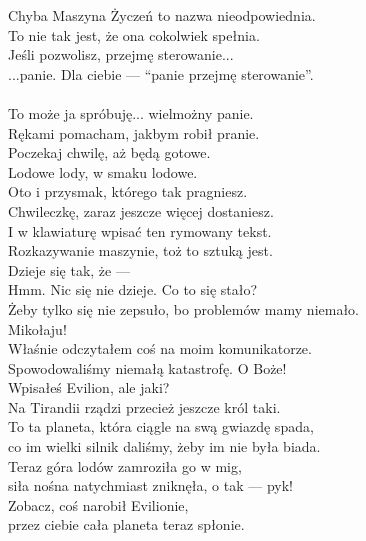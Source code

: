 \charprzy{}
Chyba Maszyna Życzeń to nazwa nieodpowiednia.\\
To nie tak jest, że ona cokolwiek spełnia.\\
Jeśli pozwolisz, przejmę sterowanie...\\

\chardok{}
...panie.
Dla ciebie --- "`panie przejmę sterowanie"'.\\

\\

\charmik{}
To może ja spróbuję... wielmożny panie.\\
Rękami pomacham, jakbym robił pranie.\\
Poczekaj chwilę, aż będą gotowe.\\
Lodowe lody, w smaku lodowe.\\
Oto i przysmak, którego tak pragniesz.\\
Chwileczkę, zaraz jeszcze więcej dostaniesz.\\
I w klawiaturę wpisać ten rymowany tekst.\\
Rozkazywanie maszynie, toż to sztuką jest.\\
Dzieje się tak, że --- \\
Hmm. Nic się nie dzieje. Co to się stało?\\
Żeby tylko się nie zepsuło, bo problemów mamy niemało.\\

\charnad{}
Mikołaju!\\
Właśnie odczytałem coś na moim komunikatorze. \\
Spowodowaliśmy niemałą katastrofę. O Boże!\\
Wpisałeś Evilion, ale jaki?\\
Na Tirandii rządzi przecież jeszcze król taki.\\
To ta planeta, która ciągle na swą gwiazdę spada,\\
co im wielki silnik daliśmy, żeby im nie była biada.\\
Teraz góra lodów zamroziła go w mig,\\
siła nośna natychmiast zniknęła, o tak --- pyk!\\

\charmik{}
Zobacz, coś narobił Evilionie,\\
przez ciebie cała planeta teraz spłonie.\\

